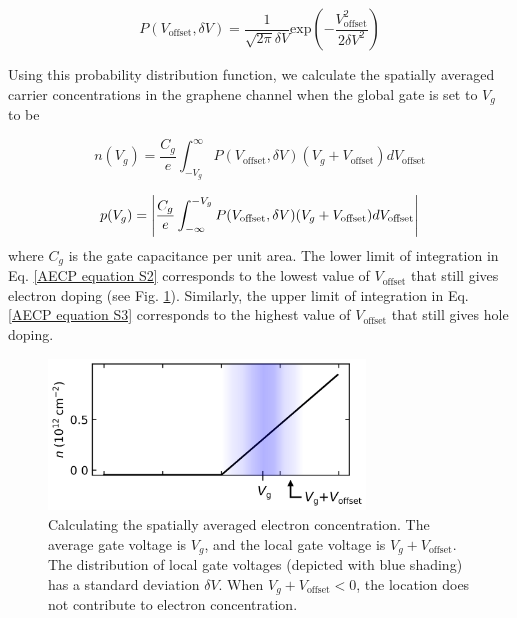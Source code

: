 \documentclass[double,12pt,1in,seploa]{beavtex}
\begin{document}
\begin{equation}
    P(V_{\mathrm{offset}}, \delta V) = \frac{1}{\sqrt{2 \pi}\delta V}\mathrm{exp}\left(-\frac{V_{\mathrm{offset}}^2}{2\delta V^2}\right)
    \label{AECP Equation S1}
\end{equation}

Using this probability distribution function, we calculate the spatially averaged carrier concentrations in the graphene channel when the global gate is set to $V_g$ to be


\begin{equation}
    n(V_g) = \frac{C_g}{e}\int_{-V_g}^{\infty}P(V_{\mathrm{offset}}, \delta V)(V_g + V_{\mathrm{offset}})dV_{\mathrm{offset}}
    \label{AECP equation S2}
\end{equation}

\begin{equation}
    p(V_g) = \abs{\frac{C_g}{e}\int_{-\infty}^{-V_g}P(V_{\mathrm{offset}}, \delta V)(V_g + V_{\mathrm{offset}})dV_{\mathrm{offset}}}
    \label{AECP equation S3}
\end{equation}
where $C_g$ is the gate capacitance per unit area. The lower limit of integration in Eq. \ref{AECP equation S2} corresponds to the lowest value of $V_{\mathrm{offset}}$ that still gives electron doping (see Fig. \ref{AECP Figure S2}). Similarly, the upper limit of integration in Eq. \ref{AECP equation S3} corresponds to the highest value of $V_{\mathrm{offset}}$ that still gives hole doping.

\begin{figure}
    \includegraphics[width = 0.75\textwidth]{Figure S2, V_offset.png}
    \caption{Calculating the spatially averaged electron concentration. The average gate voltage is $V_g$, and the local gate voltage is $V_g + V_{\mathrm{offset}}$. The distribution of local gate voltages (depicted with blue shading) has a standard deviation $\delta V$. When $V_g + V_{\mathrm{offset}} < 0$, the location does not contribute to electron concentration.}
    \label{AECP Figure S2}
\end{figure}
\end{document}
